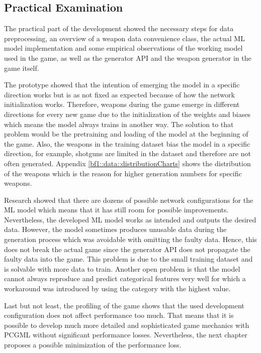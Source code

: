 \documentclass[MGS,Master,english]{twbook}%
\begin{document}
\subsection{Practical Examination}
The practical part of the development showed the necessary steps for data preprocessing, an  overview of a weapon data convenience class, the actual \ac{ML} model implementation and some empirical observations of the working model used in the game, as well as the generator \ac{API} and the weapon generator in the game itself.

The prototype showed that the intention of emerging the model in a specific direction works but is as not fixed as expected because of how the network initialization works. Therefore, weapons during the game emerge in different directions for every new game due to the initialization of the weights and biases which means the model always trains in another way. The solution to that problem would be the pretraining and loading of the model at the beginning of the game. Also, the weapons in the training dataset bias the model in a specific direction, for example, shotguns are limited in the dataset and therefore are not often generated. Appendix \ref{bf1::data::distributionCharts} shows the distribution of the weapons which is the reason for higher generation numbers for specific weapons. 

Research showed that there are dozens of possible network configurations for the \ac{ML} model which means that it has still room for possible improvements. Nevertheless, the developed \ac{ML} model works as intended and outputs the desired data. However, the model sometimes produces unusable data during the generation process which was avoidable with omitting the faulty data. Hence, this does not break the actual game since the generator \ac{API} does not propagate the faulty data into the game. This problem is due to the small training dataset and is solvable with more data to train. Another open problem is that the model cannot always reproduce and predict categorical features very well for which a workaround was introduced by using the category with the highest value.

Last but not least, the profiling of the game shows that the used development configuration does not affect performance too much. That means that it is possible to develop much more detailed and sophisticated game mechanics with \ac{PCGML} without significant performance losses. Nevertheless, the next chapter proposes a possible minimization of the performance loss.
\end{document}
